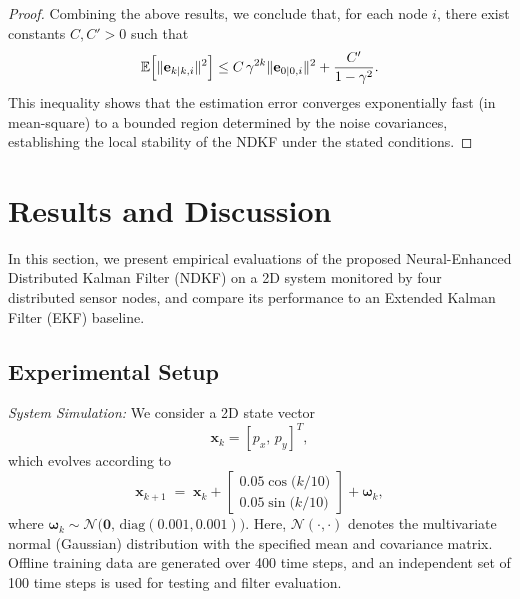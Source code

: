 \documentclass[letterpaper, 10 pt, conference]{ieeeconf}
\begin{document}
\begin{proof}
Combining the above results, we conclude that, for each node $i$, there exist constants $C, C' > 0$ such that
\begin{equation}
    \mathbb{E}\Bigl[\|\mathbf{e}_{k|k,i}\|^2\Bigr] \leq C\,\gamma^{2k} \|\mathbf{e}_{0|0,i}\|^2 + \frac{C'}{1-\gamma^2}.
\end{equation}
This inequality shows that the estimation error converges exponentially fast (in mean-square) to a bounded region determined by the noise covariances, establishing the local stability of the NDKF under the stated conditions.
\end{proof}

\section{Results and Discussion}
\label{sec:results}

In this section, we present empirical evaluations of the proposed Neural-Enhanced Distributed Kalman Filter (NDKF) on a 2D system monitored by four distributed sensor nodes, and compare its performance to an Extended Kalman Filter (EKF) baseline.

\vspace{-5pt}
\subsection{Experimental Setup}
\label{sec:exp-setup}

\noindent\textit{System Simulation:}  
We consider a 2D state vector 
\[
\mathbf{x}_k = [p_x,\, p_y]^{T},
\]
which evolves according to
\begin{equation}
    \mathbf{x}_{k+1} \;=\; \mathbf{x}_k + 
    \begin{bmatrix}
        0.05 \cos\!\bigl(k/10\bigr) \\[4pt]
        0.05 \sin\!\bigl(k/10\bigr)
    \end{bmatrix}
    + \boldsymbol{\omega}_k,
\end{equation}
where $\boldsymbol{\omega}_k \sim \mathcal{N}\bigl(\mathbf{0},\,\mathrm{diag}(0.001,0.001)\bigr)$. Here, $\mathcal{N}(\cdot,\cdot)$ denotes the multivariate normal (Gaussian) distribution with the specified mean and covariance matrix. Offline training data are generated over 400 time steps, and an independent set of 100 time steps is used for testing and filter evaluation.
\end{document}
